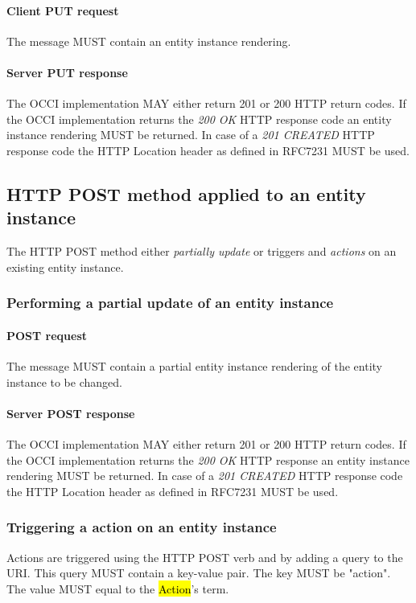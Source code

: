 \documentclass[10pt,a4paper]{article}
\begin{document}
\paragraph{Client PUT request}
The message MUST contain an entity instance rendering.

\paragraph{Server PUT response}
The OCCI implementation MAY either return 201 or 200 HTTP return codes.  If the OCCI implementation
returns the \emph{200 OK} HTTP response code an entity instance rendering MUST be returned.
In case of a \emph{201 CREATED} HTTP response code the HTTP Location header as defined in RFC7231 \cite{rfc7231} MUST be used.

\subsection{HTTP POST method applied to an entity instance}
The HTTP POST method either {\em partially update} or triggers and {\em actions} on an existing entity instance.

\subsubsection{Performing a partial update of an entity instance}

\paragraph{POST request}
The message MUST contain a partial entity instance rendering of the entity instance to be changed.

\paragraph{Server POST response}
The OCCI implementation MAY either return 201 or 200 HTTP return codes. If the OCCI implementation
returns the \emph{200 OK} HTTP response an entity instance rendering MUST be returned.
In case of a \emph{201 CREATED} HTTP response code the HTTP Location header as defined in RFC7231 \cite{rfc7231} MUST be used.

\subsubsection{Triggering a action on an entity instance}
Actions are triggered using the HTTP POST verb and by adding a query to the URI. This query MUST contain a key-value pair. The key MUST be "action". The value MUST equal to the \hl{Action}'s term.
\end{document}
